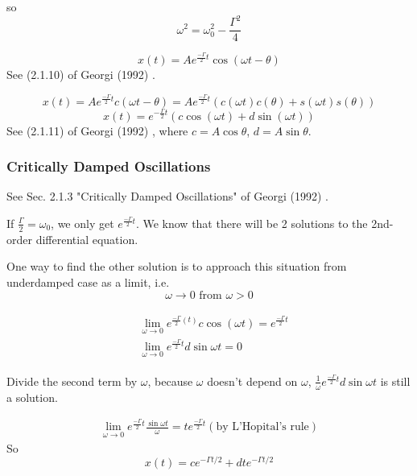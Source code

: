 \documentclass[10pt]{amsart}
\begin{document}
\begin{multicols*}{2}
so 
\begin{equation}
	\omega^2 = \omega_0^2 - \frac{ \Gamma^2}{4}
\end{equation}

\begin{equation}
	x(t) = Ae^{\frac{-\Gamma}{2} t} \cos{ (\omega t- \theta)}
\end{equation}
See (2.1.10) of Georgi (1992) \cite{Geor1992}.

\[
x(t) = A e^{\frac{-\Gamma}{2} t} c(\omega t - \theta) = Ae^{\frac{-\Gamma}{2}t } (c(\omega t) c(\theta) + s(\omega t) s(\theta))
\]
\begin{equation}\label{Eq:UnderdampedOscillationsSolution}
	x(t) = e^{-\frac{\Gamma}{2}t} (c \cos{(\omega t)} + d\sin{(\omega t)})
\end{equation}
See (2.1.11) of Georgi (1992) \cite{Geor1992}, where $c= A\cos{\theta}$, $d=A\sin{\theta}$.

\subsubsection{Critically Damped Oscillations} See Sec. 2.1.3 "Critically Damped Oscillations" of Georgi (1992) \cite{Geor1992}.

If $\frac{\Gamma}{2} = \omega_0$, we only get $e^{\frac{-\Gamma}{2} t}$. We know that there will be 2 solutions to the 2nd-order differential equation.

One way to find the other solution is to approach this situation from underdamped case as a limit, i.e.
\[
\omega \to 0 \text{ from } \omega > 0
\]

\[
\begin{gathered}
	\begin{aligned}
		& \lim_{\omega \to 0} e^{ \frac{-\Gamma}{2}(t) } c\cos{(\omega t)} = e^{ \frac{-\Gamma}{2} t} \\
		& \lim_{\omega\to 0} e^{\frac{-\Gamma}{2} t} d \sin{\omega t} = 0
	\end{aligned}
\end{gathered}
\]

Divide the second term by $\omega$, because $\omega$ doesn't depend on $\omega$, $\frac{1}{\omega} e^{\frac{-\Gamma}{2} t} d\sin{\omega t}$ is still a solution.

\[
\begin{gathered}
	\lim_{\omega \to 0} e^{ \frac{-\Gamma}{2} t} \frac{ \sin{ \omega t} }{\omega} = te^{\frac{-\Gamma}{2} t} (\text{by L'Hopital's rule})
\end{gathered}
\]
So
\[
x(t) = ce^{ - \Gamma t/2} + dte^{-\Gamma t/2}
\]


\end{multicols*}
\end{document}
